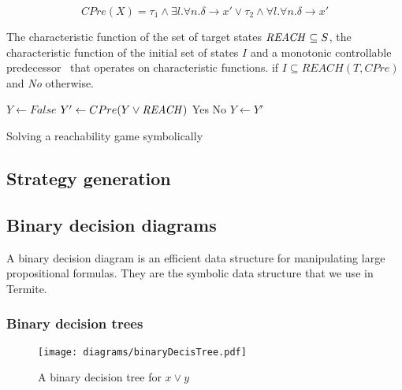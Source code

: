 \begin{equation}
CPre(X) = \tau_1 \wedge \exists l. \forall n. \delta \rightarrow x' \vee \tau_2 \wedge \forall l. \forall n. \delta \rightarrow x' 
\label{eqn:cpre_symb}
\end{equation}

\begin{algorithm}
\begin{algorithmic}

\Require The characteristic function of the set of target states $\mathit{REACH} \subseteq S$, the characteristic function of the initial set of states $I$ and a monotonic controllable predecessor \cpre\ that operates on characteristic functions.
 if $I \subseteq REACH(T, CPre)$ and {\it No} otherwise.

    \State $Y \gets False$
    \Loop
        \State $Y' \gets CPre(Y \vee \mathit{REACH})$
                \State\Return Yes
            \Else
                \State\Return No
            \EndIf
        \EndIf
        \State $Y \gets Y'$
    \EndLoop
\EndFunction

\end{algorithmic}
\caption{Solving a reachability game symbolically}
\label{a:symb_reach}
\end{algorithm}

\subsection{Strategy generation}


\subsection{Binary decision diagrams}

A binary decision diagram is an efficient data structure for manipulating large propositional formulas. They are the symbolic data structure that we use in Termite.

\subsubsection{Binary decision trees}

\begin{figure}[t]
\centering
\texttt{[image: diagrams/binaryDecisTree.pdf]}
\caption{A binary decision tree for $x \vee y$}
\label{fig:decis_tree}
\end{figure}

